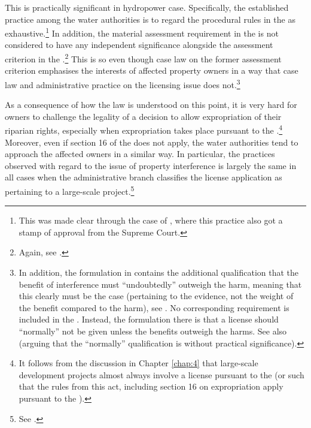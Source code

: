 This is practically significant in hydropower case. Specifically, the established practice among the water authorities is to regard the procedural rules in the \cite{wra17} as exhaustive.\footnote{This was made clear through the case of \cite{jorpeland11}, where this practice also got a stamp of approval from the Supreme Court.} In addition, the material assessment requirement in the \cite{ea59} is not considered to have any independent significance alongside the assessment criterion in the \cite{wra17}.\footnote{Again, see \cite{jorpeland11}.} This is so even though case law on the former assessment criterion emphasises the interests of affected property owners in a way that case law and administrative practice on the licensing issue does not.\footnote{In addition, the formulation in \cite[2]{ea59} contains the additional qualification that the benefit of interference must ``undoubtedly'' outweigh the harm, meaning that this clearly must be the case (pertaining to the evidence, not the weight of the benefit compared to the harm), see \cite{lovenskiold09}. No corresponding requirement is included in the \cite[8]{wra17}. Instead, the formulation there is that a license should ``normally'' not be given unless the benefits outweigh the harms. See also \cite[325-236]{haagensen02} (arguing that the ``normally'' qualification is without practical significance).}


As a consequence of how the law is understood on this point, it is very hard for owners to challenge the legality of a decision to allow expropriation of their riparian rights, especially when expropriation takes place pursuant to the \cite{wra17}.\footnote{It follows from the discussion in Chapter \ref{chap:4} that large-scale development projects almost always involve a license pursuant to the \cite{wra17} (or such that the rules from this act, including section 16 on expropriation apply pursuant to the \cite{wra00}).} Moreover, even if section 16 of the \cite{wra17} does not apply, the water authorities tend to approach the affected owners in a similar way. In particular, the practices observed with regard to the issue of property interference is largely the same in all cases when the administrative branch classifies the license application as pertaining to a large-scale project.\footnote{See \cite{flatby08}.}

